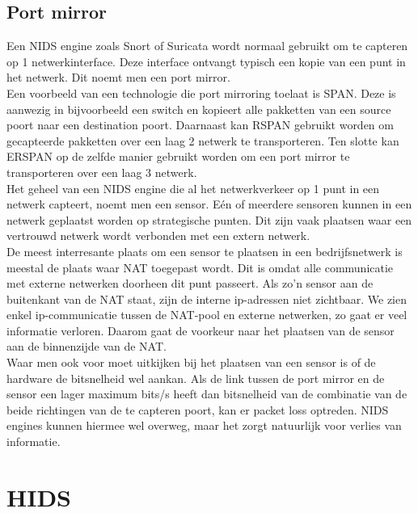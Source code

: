 \documentclass[a4paper,12pt]{report}
\begin{document}
\subsection{Port mirror}
Een NIDS engine zoals Snort of Suricata wordt normaal gebruikt om te capteren op 1 netwerkinterface.
Deze interface ontvangt typisch een kopie van een punt in het netwerk.
Dit noemt men een port mirror.
\\
Een voorbeeld van een technologie die port mirroring toelaat is SPAN.
Deze is aanwezig in bijvoorbeeld een switch en kopieert alle pakketten van een source poort naar een destination poort.
Daarnaast kan RSPAN gebruikt worden om gecapteerde pakketten over een laag 2 netwerk te transporteren.
Ten slotte kan ERSPAN op de zelfde manier gebruikt worden om een port mirror te transporteren over een laag 3 netwerk.
\autocite{cisco:span}
\\
Het geheel van een NIDS engine die al het netwerkverkeer op 1 punt in een netwerk capteert, noemt men een sensor.
Eén of meerdere sensoren kunnen in een netwerk geplaatst worden op strategische punten.
Dit zijn vaak plaatsen waar een vertrouwd netwerk wordt verbonden met een extern netwerk.
\\
De meest interresante plaats om een sensor te plaatsen in een bedrijfsnetwerk is meestal de plaats waar NAT toegepast wordt.
Dit is omdat alle communicatie met externe netwerken doorheen dit punt passeert.
Als zo'n sensor aan de buitenkant van de NAT staat, zijn de interne ip-adressen niet zichtbaar.
We zien enkel ip-communicatie tussen de NAT-pool en externe netwerken, zo gaat er veel informatie verloren.
Daarom gaat de voorkeur naar het plaatsen van de sensor aan de binnenzijde van de NAT.
\\
Waar men ook voor moet uitkijken bij het plaatsen van een sensor is of de hardware de bitsnelheid wel aankan.
Als de link tussen de port mirror en de sensor een lager maximum bits/s heeft dan bitsnelheid van de combinatie van de beide richtingen van de te capteren poort, kan er packet loss optreden.
NIDS engines kunnen hiermee wel overweg, maar het zorgt natuurlijk voor verlies van informatie.

\section{HIDS}
\end{document}
